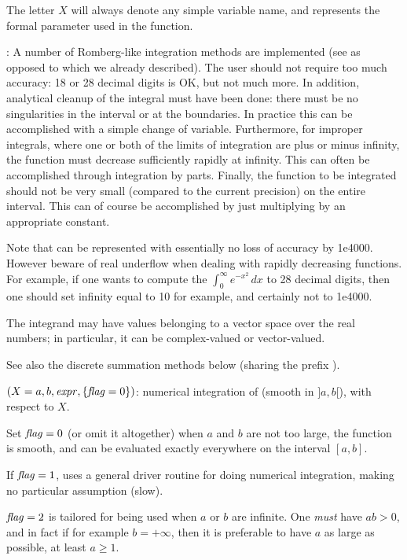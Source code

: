 The letter $X$ will always denote any simple variable name, and represents
the formal parameter used in the function.

: A number
of Romberg-like integration methods are implemented (see  as
opposed to  which we already described). The user should not
require too much accuracy: 18 or 28 decimal digits is OK, but not much more.
In addition, analytical cleanup of the integral must have been done: there
must be no singularities in the interval or at the boundaries. In practice
this can be accomplished with a simple change of variable. Furthermore, for
improper integrals, where one or both of the limits of integration are plus
or minus infinity, the function must decrease sufficiently rapidly at
infinity. This can often be accomplished through integration by parts.
Finally, the function to be integrated should not be very small
(compared to the current precision) on the entire interval. This can
of course be accomplished by just multiplying by an appropriate
constant.

Note that  can be represented with essentially no loss of
accuracy by 1e4000. However beware of real underflow when dealing with
rapidly decreasing functions. For example, if one wants to compute the
$\int_0^\infty e^{-x^2}\,dx$ to 28 decimal digits, then one should set
infinity equal to 10 for example, and certainly not to 1e4000.

The integrand may have values belonging to a vector space over the real
numbers; in particular, it can be complex-valued or vector-valued.

See also the discrete summation methods below (sharing the prefix ).

$(X=a,b,\hbox{\it expr\/},\{\hbox{\it f\kern0pt lag\/}=0\})$: numerical integration of
 (smooth in $]a,b[$), with respect to $X$.

Set $\hbox{\it f\kern0pt lag\/}=0$ (or omit it altogether) when $a$ and $b$ are not too large, the
function is smooth, and can be evaluated exactly everywhere on the interval
$[a,b]$.

If $\hbox{\it f\kern0pt lag\/}=1$, uses a general driver routine for doing numerical integration,
making no particular assumption (slow).

$\hbox{\it f\kern0pt lag\/}=2$ is tailored for being used when $a$ or $b$ are infinite. One
\emph{must} have $ab>0$, and in fact if for example $b=+\infty$, then it is
preferable to have $a$ as large as possible, at least $a\ge1$.

